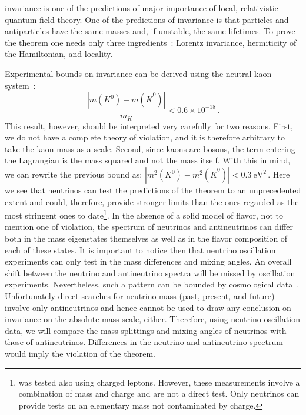 %
 invariance is one of the predictions of major importance of local, relativistic quantum field theory. One of the predictions of  invariance is that particles and antiparticles have the same masses and, if unstable, the same lifetimes. To prove the  theorem one needs only three ingredients~\cite{Streater:1989vi}: Lorentz invariance, hermiticity of the Hamiltonian, and locality.
%

Experimental bounds on  invariance can be derived using the neutral kaon system~\cite{Schwingenheuer:1995uf}:
%
\begin{equation}
  \frac{|m(K^0) - m(\overline{K}^0)|}{m_K} < 0.6 \times 10^{-18}\,. 
  \label{eq:mK}
\end{equation}
%
This result, however, should be interpreted very carefully for two reasons. First, we do not have a complete theory of  violation, and it is therefore arbitrary to take the kaon-mass as a scale. Second, since kaons are bosons, the term entering the Lagrangian is the mass squared and not the mass itself. With this in mind, we can rewrite the previous bound as:
%
 $ |m^2(K^0) - m^2(\overline{K}^0)| < 0.3~\mbox{eV}^2 \, $.
%
Here we %
see that neutrinos can test the predictions of the  theorem to an unprecedented extent and could, therefore, provide stronger limits than the ones regarded as the most stringent ones %
to date\footnote{ was tested also using charged leptons. However, these measurements involve a combination
of mass and charge and are not a direct  test. Only neutrinos can provide  tests on an elementary mass not contaminated by charge.}. 
%
In the absence of a solid model of flavor, not to mention one of  violation, the spectrum  of neutrinos and antineutrinos can differ both  in the mass eigenstates themselves as well as in the flavor composition of each of these states. It is important to notice then that neutrino oscillation experiments can only test  in the mass differences and mixing angles. An overall shift between the neutrino and antineutrino spectra will be missed by oscillation experiments.  Nevertheless, such a pattern can be bounded by cosmological data~\cite{Barenboim:2017vlc}. Unfortunately direct searches for neutrino mass (past, present, and future) involve only antineutrinos and hence cannot be used to draw any conclusion on  invariance on the absolute mass scale, either.
%
Therefore, using neutrino oscillation data, we will compare the mass splittings and mixing angles of  neutrinos with those of antineutrinos. Differences in the neutrino and antineutrino spectrum would imply the violation of the  theorem.

